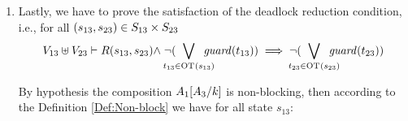 \documentclass[runningheads]{llncs}
\begin{document}
\begin{enumerate}
%
%	
%



\item Lastly, we have to prove the satisfaction of the deadlock reduction condition, i.e., for all ${\left(s_{13}, s_{23}\right)} \in S_{13} \times S_{23}$
\begin{multline*}
V_{13} \uplus V_{23}  \vdash  R\mpar{s_{13}, s_{23}} \nwedge  \neg(\bigvee_\subbox{t_{13} \in \fOT{s_{13}}} \fguard{t_{13}}) \implies   \neg (\bigvee_\subbox{t_{23} \in \fOT{s_{23}}} \fguard{t_{23}}) 
\end{multline*}

By hypothesis  the composition  \(A_1{\left[A_3\middle/k\right]}\) is non-blocking,  then according to the Definition \ref{Def:Non-block} we have for all state $s_{13}$: 



\end{enumerate}
\end{document}
